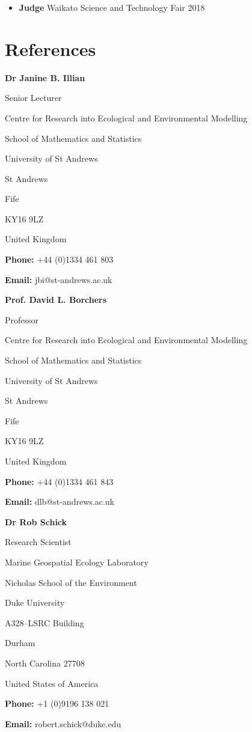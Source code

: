 \documentclass[10pt,a4paper]{moderncv}
\begin{document}
\vspace{5pt}

\begin{itemize}
\item \textbf{Judge} Waikato Science and Technology Fair 2018
\end{itemize}

\newpage
\section{References}


\vspace{6pt}
 
\textbf{Dr Janine B. Illian}

Senior Lecturer

Centre for Research into Ecological and Environmental Modelling

School of Mathematics and Statistics

University of St Andrews

St Andrews

Fife

KY16 9LZ

United Kingdom

\textbf{Phone:} +44 (0)1334 461 803

\textbf{Email:} jbi@st-andrews.ac.uk

\vspace{6pt}
 
\textbf{Prof. David L. Borchers}

Professor

Centre for Research into Ecological and Environmental Modelling

School of Mathematics and Statistics

University of St Andrews

St Andrews

Fife

KY16 9LZ

United Kingdom

\textbf{Phone:} +44 (0)1334 461 843

\textbf{Email:} dlb@st-andrews.ac.uk

\vspace{6pt}
 
\textbf{Dr Rob Schick}

Research Scientist

Marine Geospatial Ecology Laboratory

Nicholas School of the Environment 

Duke University 

A328–LSRC Building

Durham

North Carolina 27708

United States of America

\textbf{Phone:} +1 (0)9196 138 021

\textbf{Email:} robert.schick@duke.edu


\end{document}
